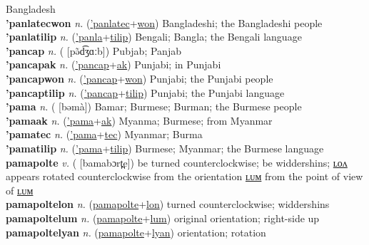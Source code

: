 Bangladesh \label{'panlatec} \\
\textbf{'panlatecwon} \textit{n.} (\hyperref['panlatec]{'panlatec}+\hyperref[won]{won})
Bangladeshi; the Bangladeshi people \label{'panlatecwon} \\
\textbf{'panlatilip} \textit{n.} (\hyperref['panla]{'panla}+\hyperref[tilip]{tilip})
Bengali; Bangla; the Bengali language \label{'panlatilip} \\
\textbf{'pancap} \textit{n.} ( [pə̃d͡ʒɑːb])
Pubjab; Panjab \label{'pancap} \\
\textbf{'pancapak} \textit{n.} (\hyperref['pancap]{'pancap}+\hyperref[ak]{ak})
Punjabi; in Punjabi \label{'pancapak} \\
\textbf{'pancapwon} \textit{n.} (\hyperref['pancap]{'pancap}+\hyperref[won]{won})
Punjabi; the Punjabi people \label{'pancapwon} \\
\textbf{'pancaptilip} \textit{n.} (\hyperref['pancap]{'pancap}+\hyperref[tilip]{tilip})
Punjabi; the Punjabi language \label{'pancaptilip} \\
\textbf{'pama} \textit{n.} ( [bəmà])
Bamar; Burmese; Burman; the Burmese people \label{'pama} \\
\textbf{'pamaak} \textit{n.} (\hyperref['pama]{'pama}+\hyperref[ak]{ak})
Myanma; Burmese; from Myanmar \label{'pamaak} \\
\textbf{'pamatec} \textit{n.} (\hyperref['pama]{'pama}+\hyperref[tec]{tec})
Myanmar; Burma \label{'pamatec} \\
\textbf{'pamatilip} \textit{n.} (\hyperref['pama]{'pama}+\hyperref[tilip]{tilip})
Burmese; Myanmar; the Burmese language \label{'pamatilip} \\
\textbf{pamapolte} \textit{v.} ( [bamabɔrt̪e])
be turned counterclockwise; be widdershins; \hyperref[pamapoltelon]{ʟᴏᴧ} appears rotated counterclockwise from the orientation \hyperref[pamapoltelum]{ʟᴜᴍ} from the point of view of \hyperref[pamapoltelum]{ʟᴜᴍ} \label{pamapolte} \\
\textbf{pamapoltelon} \textit{n.} (\hyperref[pamapolte]{pamapolte}+\hyperref[lon]{lon})
turned counterclockwise; widdershins \label{pamapoltelon} \\
\textbf{pamapoltelum} \textit{n.} (\hyperref[pamapolte]{pamapolte}+\hyperref[lum]{lum})
original orientation; right-side up \label{pamapoltelum} \\
\textbf{pamapoltelyan} \textit{n.} (\hyperref[pamapolte]{pamapolte}+\hyperref[lyan]{lyan})
orientation; rotation \label{pamapoltelyan} \\
